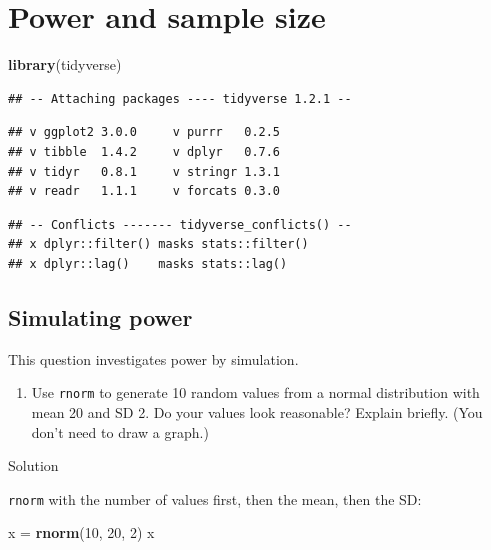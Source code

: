 \documentclass[]{tufte-book}
\newenvironment{Shaded}{}{}
\newcommand{\DecValTok}[1]{\textcolor[rgb]{0.25,0.63,0.44}{#1}}
\newcommand{\KeywordTok}[1]{\textcolor[rgb]{0.00,0.44,0.13}{\textbf{#1}}}
\newcommand{\NormalTok}[1]{#1}
\newcommand{\StringTok}[1]{\textcolor[rgb]{0.25,0.44,0.63}{#1}}
\providecommand{\tightlist}{%
  \setlength{\itemsep}{0pt}\setlength{\parskip}{0pt}}
\theoremstyle{definition}
\theoremstyle{definition}
\theoremstyle{definition}
\theoremstyle{remark}
\begin{document}
\hypertarget{power-and-sample-size}{%
\chapter{Power and sample size}\label{power-and-sample-size}}

\begin{Shaded}
\begin{Highlighting}[]
\KeywordTok{library}\NormalTok{(tidyverse)}
\end{Highlighting}
\end{Shaded}

\begin{verbatim}
## -- Attaching packages ---- tidyverse 1.2.1 --
\end{verbatim}

\begin{verbatim}
## v ggplot2 3.0.0     v purrr   0.2.5
## v tibble  1.4.2     v dplyr   0.7.6
## v tidyr   0.8.1     v stringr 1.3.1
## v readr   1.1.1     v forcats 0.3.0
\end{verbatim}

\begin{verbatim}
## -- Conflicts ------- tidyverse_conflicts() --
## x dplyr::filter() masks stats::filter()
## x dplyr::lag()    masks stats::lag()
\end{verbatim}

\hypertarget{simulating-power}{%
\section{Simulating power}\label{simulating-power}}

This question investigates power by simulation.

\begin{enumerate}
\def\labelenumi{(\alph{enumi})}
\tightlist
\item
  Use \texttt{rnorm} to generate 10 random values from a normal
  distribution with mean 20 and SD 2. Do your values look reasonable?
  Explain briefly. (You don't need to draw a graph.)
\end{enumerate}

Solution

\texttt{rnorm} with the number of values first, then the mean, then the
SD:

\begin{Shaded}
\begin{Highlighting}[]
\NormalTok{x =}\StringTok{ }\KeywordTok{rnorm}\NormalTok{(}\DecValTok{10}\NormalTok{, }\DecValTok{20}\NormalTok{, }\DecValTok{2}\NormalTok{)}
\NormalTok{x}
\end{Highlighting}
\end{Shaded}
\end{document}
